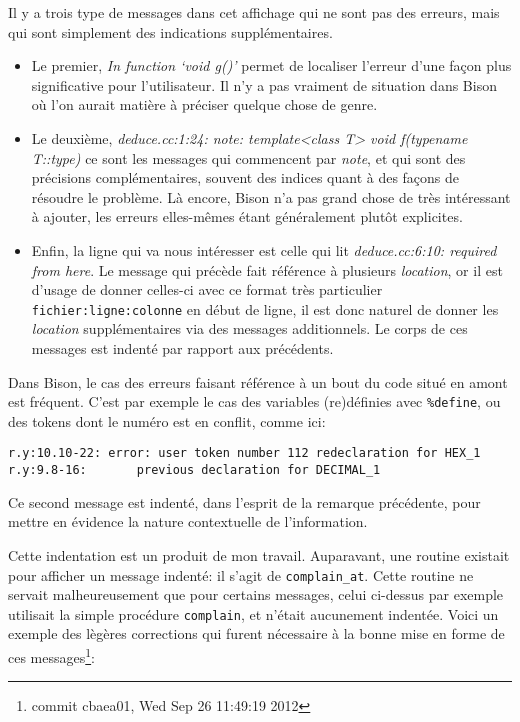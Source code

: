 \documentclass[a4paper,11pt,twoside,final]{article}
\begin{document}
  Il y a trois type de messages dans cet affichage qui ne sont pas des erreurs,
  mais qui sont simplement des indications supplémentaires.

  \begin{itemize}
    \item Le premier, \og \textit{In function `void g()'} \fg permet de
      localiser l'erreur d'une façon plus significative pour l'utilisateur. Il
      n'y a pas vraiment de situation dans Bison où l'on aurait matière à
      préciser quelque chose de genre.
    \item Le deuxième, \og \textit{deduce.cc:1:24: note: template<class T> void
      f(typename T::type)} \fg ce sont les messages qui commencent par
      \textit{note}, et qui sont des précisions complémentaires, souvent des
      indices quant à des façons de résoudre le problème. Là encore, Bison n'a
      pas grand chose de très intéressant à ajouter, les erreurs elles-mêmes
      étant généralement plutôt explicites.
    \item Enfin, la ligne qui va nous intéresser est celle qui lit \og
      \textit{deduce.cc:6:10:   required from here}\fg. Le message qui précède
      fait référence à plusieurs \textit{location}, or il est d'usage de donner
      celles-ci avec ce format très particulier \texttt{fichier:ligne:colonne}
      en début de ligne, il est donc naturel de donner les \textit{location}
      supplémentaires via des messages additionnels. Le corps de ces messages
      est indenté par rapport aux précédents.
  \end{itemize}

  Dans Bison, le cas des erreurs faisant référence à un bout du code situé en
  amont est fréquent. C'est par exemple le cas des variables (re)définies avec
  \texttt{\%define}, ou des tokens dont le numéro est en conflit, comme ici:

  \begin{verbatim}
r.y:10.10-22: error: user token number 112 redeclaration for HEX_1
r.y:9.8-16:       previous declaration for DECIMAL_1
  \end{verbatim}

  Ce second message est indenté, dans l'esprit de la remarque précédente, pour
  mettre en évidence la nature contextuelle de l'information.

  Cette indentation est un produit de mon travail. Auparavant, une routine
  existait pour afficher un message indenté: il s'agit de
  \texttt{complain\_at}.  Cette routine ne servait malheureusement que pour
  certains messages, celui ci-dessus par exemple utilisait la simple procédure
  \texttt{complain}, et n'était aucunement indentée. Voici un exemple des
  lègères corrections qui furent nécessaire à la bonne mise en forme de ces
  messages\footnote{commit cbaea01, Wed Sep 26 11:49:19 2012}:
\end{document}
